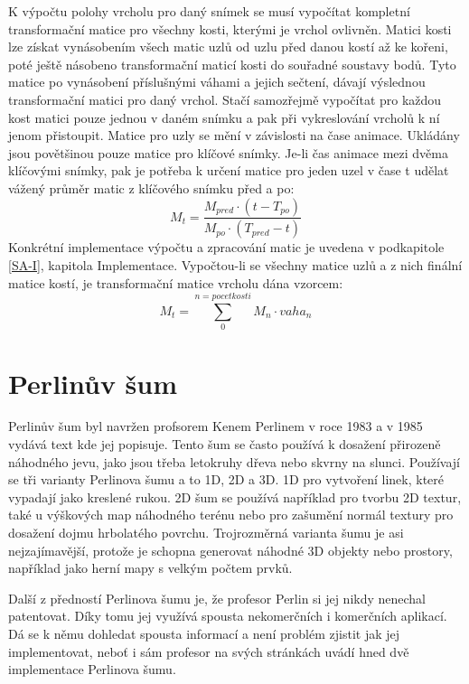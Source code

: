 K výpočtu polohy vrcholu pro daný snímek se musí vypočítat kompletní transformační matice pro všechny kosti, kterými je vrchol ovlivněn. Matici kosti lze získat vynásobením všech matic uzlů od uzlu před danou kostí až ke kořeni, poté ještě násobeno transformační maticí kosti do souřadné soustavy bodů. Tyto matice po vynásobení příslušnými váhami a jejich sečtení, dávají výslednou transformační matici pro daný vrchol. Stačí samozřejmě vypočítat pro každou kost matici pouze jednou v daném snímku a pak při vykreslování vrcholů k ní jenom přistoupit. Matice pro uzly se mění v závislosti na čase animace. Ukládány jsou povětšinou pouze matice pro klíčové snímky. Je-li čas animace mezi dvěma klíčovými snímky, pak je potřeba k určení matice pro jeden uzel v čase t udělat vážený průměr matic z klíčového snímku před a po:
\begin{equation}\label{SAprumer}
M_t = \frac{M_{pred} \cdot (t - T_{po})}{M_{po} \cdot (T_{pred} - t)}
\end{equation}
Konkrétní implementace výpočtu a zpracování matic je uvedena v podkapitole \ref{SA-I}, kapitola Implementace. Vypočtou-li se všechny matice uzlů a z nich finální matice kostí, je transformační matice vrcholu dána vzorcem:
\begin{equation}\label{SAvzorec}
M_t = \sum_{0}^{n = pocet kosti} M_n \cdot vaha_n
\end{equation}
  
\section{Perlinův šum}
Perlinův šum byl navržen profsorem Kenem Perlinem v roce 1983 a v 1985 vydává text kde jej popisuje\cite{KP-old}. Tento šum se často používá k dosažení přirozeně náhodného jevu, jako jsou třeba letokruhy dřeva nebo skvrny na slunci. Používají se tři varianty Perlinova šumu a to 1D, 2D a 3D. 1D pro vytvoření linek, které vypadají jako kreslené rukou. 2D šum se používá například pro tvorbu 2D textur, také u výškových map náhodného terénu nebo pro zašumění normál textury pro dosažení dojmu hrbolatého povrchu. Trojrozměrná varianta šumu je asi nejzajímavější, protože je schopna generovat náhodné 3D objekty nebo prostory, například jako herní mapy s velkým počtem prvků.

Další z předností Perlinova šumu je, že profesor Perlin si jej nikdy nenechal patentovat. Díky tomu jej využívá spousta nekomerčních i komerčních aplikací. Dá se k němu dohledat spousta informací a není problém zjistit jak jej implementovat, neboť i sám profesor na svých stránkách\cite{KP-site} uvádí hned dvě implementace Perlinova šumu. 

